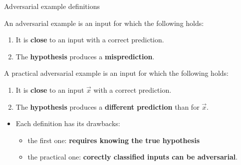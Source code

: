 \documentclass{beamer}
\begin{document}
\begin{frame}[allowframebreaks=0.9]{Adversarial example definitions}
	\begin{definition} \label{def:ae-consistent}
	An adversarial example is an input for which the following holds:
	\begin{enumerate}
		\item It is \textbf{close} to an input with a correct prediction.
		\item The \textbf{hypothesis} produces a \textbf{misprediction}.
	\end{enumerate}
	\end{definition}
	\begin{definition} \label{def:ae-practical}
		A practical adversarial example is an input for which the following holds:
		\begin{enumerate}
			\item It is \textbf{close} to an input $\vec x$ with a correct prediction.
			\item The \textbf{hypothesis} produces a \textbf{different prediction} than for $\vec x$.
		\end{enumerate}
	\end{definition}
	\begin{itemize}
		\item Each definition has its drawbacks:
		\begin{itemize}
			\item the first one: \textbf{requires knowing the true hypothesis}
			\item the practical one: \textbf{corectly classified inputs can be adversarial}.
		\end{itemize}
	\end{itemize}
\end{frame}
\end{document}
